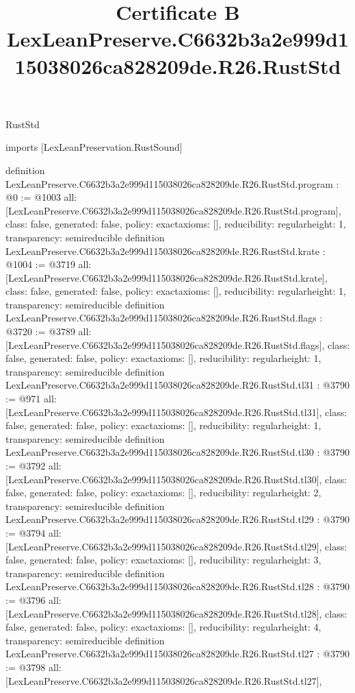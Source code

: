 \begin{lexlean}{RustStd}
\title{Certificate B LexLeanPreserve.C6632b3a2e999d115038026ca828209de.R26.RustStd}
\begin{coremodule}
imports [LexLeanPreservation.RustSound]

definition LexLeanPreserve.C6632b3a2e999d115038026ca828209de.R26.RustStd.program : @0 := @1003 {
  all: [LexLeanPreserve.C6632b3a2e999d115038026ca828209de.R26.RustStd.program],
  class: false,
  generated: false,
  policy: exact{axioms: []},
  reducibility: regular{height: 1},
  transparency: semireducible
}
definition LexLeanPreserve.C6632b3a2e999d115038026ca828209de.R26.RustStd.krate : @1004 := @3719 {
  all: [LexLeanPreserve.C6632b3a2e999d115038026ca828209de.R26.RustStd.krate],
  class: false,
  generated: false,
  policy: exact{axioms: []},
  reducibility: regular{height: 1},
  transparency: semireducible
}
definition LexLeanPreserve.C6632b3a2e999d115038026ca828209de.R26.RustStd.flags : @3720 := @3789 {
  all: [LexLeanPreserve.C6632b3a2e999d115038026ca828209de.R26.RustStd.flags],
  class: false,
  generated: false,
  policy: exact{axioms: []},
  reducibility: regular{height: 1},
  transparency: semireducible
}
definition LexLeanPreserve.C6632b3a2e999d115038026ca828209de.R26.RustStd.tl31 : @3790 := @971 {
  all: [LexLeanPreserve.C6632b3a2e999d115038026ca828209de.R26.RustStd.tl31],
  class: false,
  generated: false,
  policy: exact{axioms: []},
  reducibility: regular{height: 1},
  transparency: semireducible
}
definition LexLeanPreserve.C6632b3a2e999d115038026ca828209de.R26.RustStd.tl30 : @3790 := @3792 {
  all: [LexLeanPreserve.C6632b3a2e999d115038026ca828209de.R26.RustStd.tl30],
  class: false,
  generated: false,
  policy: exact{axioms: []},
  reducibility: regular{height: 2},
  transparency: semireducible
}
definition LexLeanPreserve.C6632b3a2e999d115038026ca828209de.R26.RustStd.tl29 : @3790 := @3794 {
  all: [LexLeanPreserve.C6632b3a2e999d115038026ca828209de.R26.RustStd.tl29],
  class: false,
  generated: false,
  policy: exact{axioms: []},
  reducibility: regular{height: 3},
  transparency: semireducible
}
definition LexLeanPreserve.C6632b3a2e999d115038026ca828209de.R26.RustStd.tl28 : @3790 := @3796 {
  all: [LexLeanPreserve.C6632b3a2e999d115038026ca828209de.R26.RustStd.tl28],
  class: false,
  generated: false,
  policy: exact{axioms: []},
  reducibility: regular{height: 4},
  transparency: semireducible
}
definition LexLeanPreserve.C6632b3a2e999d115038026ca828209de.R26.RustStd.tl27 : @3790 := @3798 {
  all: [LexLeanPreserve.C6632b3a2e999d115038026ca828209de.R26.RustStd.tl27],
}
\end{coremodule}
\end{lexlean}
